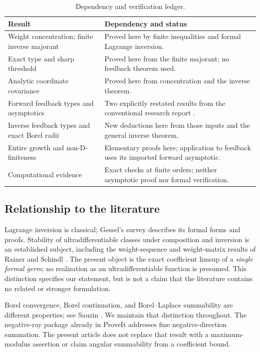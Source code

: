 \documentclass[11pt,a4paper]{article}
\numberwithin{equation}{section}
\theoremstyle{definition}
\theoremstyle{remark}
\begin{document}
\begin{table}[htbp]
\centering\small
\begin{tabular}{p{}p{}}
\toprule
Result & Dependency and status\\
\midrule
Weight concentration; finite inverse majorant & Proved here by finite
inequalities and formal Lagrange inversion.\\[2mm]
Exact type and sharp threshold & Proved here from the finite majorant; no
feedback theorem used.\\[2mm]
Analytic coordinate covariance & Proved here from concentration and the
inverse theorem.\\[2mm]
Forward feedback types and asymptotics & Two explicitly restated results
from the conventional research report \cite{feedback}.\\[2mm]
Inverse feedback types and exact Borel radii & New deductions here from
those inputs and the general inverse theorem.\\[2mm]
Entire growth and non-D-finiteness & Elementary proofs here; application
to feedback uses its imported forward asymptotic.\\[2mm]
Computational evidence & Exact checks at finite orders; neither asymptotic
proof nor formal verification.\\
\bottomrule
\end{tabular}
\caption{Dependency and verification ledger.}
\label{tab:dependencies}
\end{table}

\subsection{Relationship to the literature}

Lagrange inversion is classical; Gessel's survey \cite{gessel} describes
its formal forms and proofs. Stability of ultradifferentiable classes
under composition and inversion is an established subject, including the
weight-sequence and weight-matrix results of Rainer and Schindl
\cite{rainerschindl,stability}. The present object is the exact coefficient
limsup of a \emph{single formal germ}; no realization as an
ultradifferentiable function is presumed. This distinction specifies our
statement, but is not a claim that the literature contains no related or
stronger formulation.

Borel convergence, Borel continuation, and Borel--Laplace summability are
different properties; see Sauzin \cite{sauzin}. We maintain that distinction
throughout. The negative-ray package already in ProveIt \cite{negativeray}
addresses fine negative-direction summation. The present article does not
replace that result with a maximum-modulus assertion or claim angular
summability from a coefficient bound.
\end{document}
